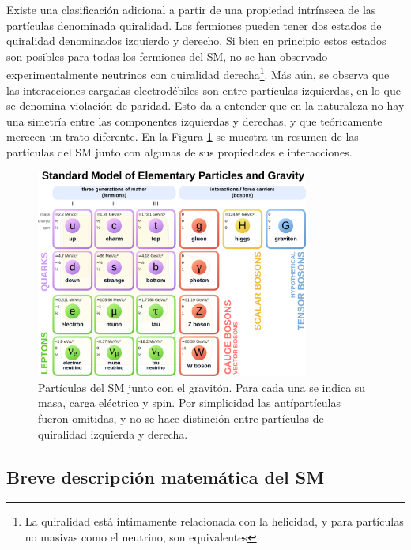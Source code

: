 Existe una clasificación adicional a partir de una propiedad intrínseca de las partículas denominada quiralidad. 
Los fermiones pueden tener dos estados de quiralidad denominados izquierdo y derecho. Si bien en principio estos estados son posibles para todas los fermiones del SM, no se han observado experimentalmente neutrinos con quiralidad derecha\footnote{La quiralidad está íntimamente relacionada con la helicidad, y para partículas no masivas como el neutrino, son equivalentes}. Más aún, se observa que las interacciones cargadas electrodébiles son entre partículas izquierdas, 
en lo que se denomina violación de paridad. Esto da a entender que en la naturaleza no hay una simetría entre las componentes izquierdas y derechas, y que teóricamente merecen un trato diferente.
En la Figura \ref{fig:sm_particles} se muestra un resumen de las partículas del SM junto con algunas de sus propiedades e interacciones.

\begin{figure}
  \centering
  \includegraphics[width=0.8\textwidth]{images/theory/sm_particles_4.pdf}
  \caption{Partículas del SM junto con el gravitón. Para cada una se indica su masa, carga eléctrica y spin. Por simplicidad las antípartículas fueron omitidas, y no se hace distinción entre partículas de quiralidad izquierda y derecha.}
  \label{fig:sm_particles}
\end{figure}


\subsection{Breve descripción matemática del SM}

